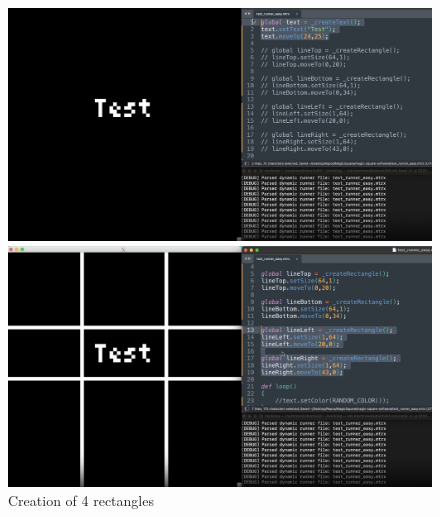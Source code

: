 \begin{figure}[h] \centering \begin{minipage}[b]{0.49\textwidth} \centering \includegraphics[width=\textwidth]{tesi/img/chai_demo/1.png} \caption*{Creation of a Text drawable} \end{minipage} \begin{minipage}[b]{0.49\textwidth} \centering \includegraphics[width=\textwidth]{tesi/img/chai_demo/2.png} \caption*{Creation of 4 rectangles} \end{minipage} \end{figure}


